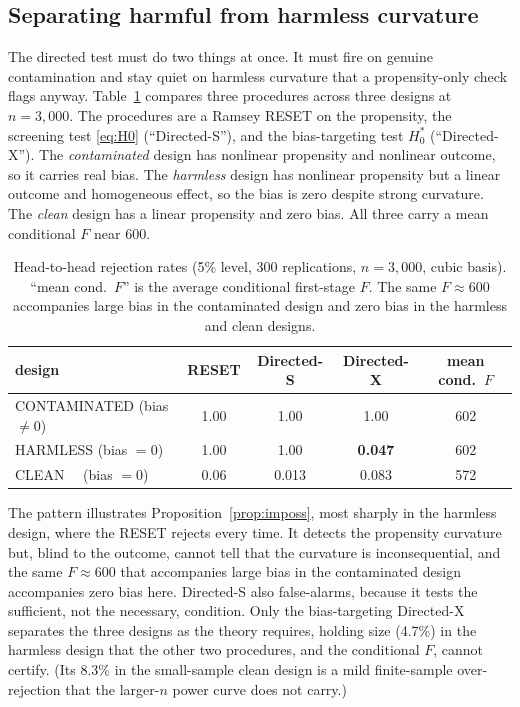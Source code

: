 \documentclass[11pt]{article}
\theoremstyle{plain}
\theoremstyle{definition}
\begin{document}
\subsection{Separating harmful from harmless curvature}

The directed test must do two things at once. It must fire on genuine contamination and stay quiet on harmless curvature that a propensity-only check flags anyway. Table~\ref{tab:head} compares three procedures across three designs at $n=3{,}000$. The procedures are a Ramsey RESET on the propensity, the screening test \eqref{eq:H0} (``Directed-S''), and the bias-targeting test $H_0^\ast$ (``Directed-X''). The \emph{contaminated} design has nonlinear propensity and nonlinear outcome, so it carries real bias. The \emph{harmless} design has nonlinear propensity but a linear outcome and homogeneous effect, so the bias is zero despite strong curvature. The \emph{clean} design has a linear propensity and zero bias. All three carry a mean conditional $F$ near 600.

\begin{table}[t]
\centering
\caption{Head-to-head rejection rates (5\% level, 300 replications, $n=3{,}000$, cubic basis). ``mean cond.\ $F$'' is the average \citet{sw2016} conditional first-stage $F$. The same $F\approx 600$ accompanies large bias in the contaminated design and zero bias in the harmless and clean designs.}
\label{tab:head}
\begin{tabular}{lcccc}
\toprule
design & RESET & Directed-S & Directed-X & mean cond.\ $F$\\
\midrule
CONTAMINATED (bias $\neq 0$) & 1.00 & 1.00 & 1.00 & 602\\
HARMLESS \quad(bias $=0$) & 1.00 & 1.00 & \textbf{0.047} & 602\\
CLEAN \qquad\ \ (bias $=0$) & 0.06 & 0.013 & 0.083 & 572\\
\bottomrule
\end{tabular}
\end{table}

The pattern illustrates Proposition~\ref{prop:imposs}, most sharply in the harmless design, where the RESET rejects every time. It detects the propensity curvature but, blind to the outcome, cannot tell that the curvature is inconsequential, and the same $F\approx 600$ that accompanies large bias in the contaminated design accompanies zero bias here. Directed-S also false-alarms, because it tests the sufficient, not the necessary, condition. Only the bias-targeting Directed-X separates the three designs as the theory requires, holding size (4.7\%) in the harmless design that the other two procedures, and the conditional $F$, cannot certify. (Its 8.3\% in the small-sample clean design is a mild finite-sample over-rejection that the larger-$n$ power curve does not carry.)
\end{document}
